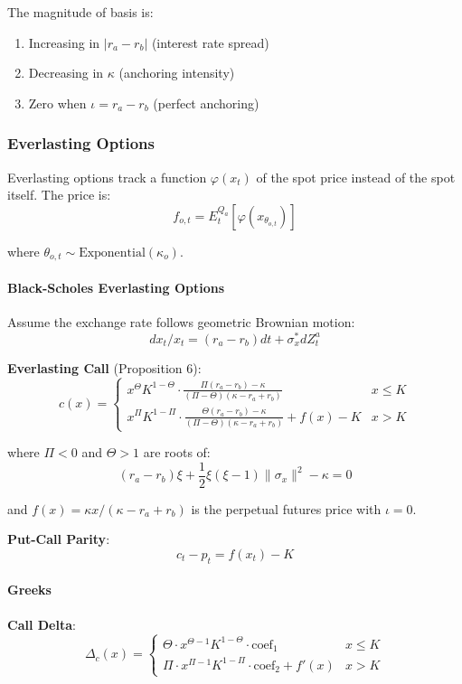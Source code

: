 The magnitude of basis is:
\begin{enumerate}
  \item Increasing in $|r_a - r_b|$ (interest rate spread)
  \item Decreasing in $\kappa$ (anchoring intensity)
  \item Zero when $\iota = r_a - r_b$ (perfect anchoring)
\end{enumerate}

\subsubsection{Everlasting Options}

Everlasting options track a function $\varphi(x_t)$ of the spot price instead of the spot itself. The price is:
\[
f_{o,t} = E^{Q_a}_t\left[\varphi(x_{\theta_{o,t}})\right]
\]

where $\theta_{o,t} \sim \text{Exponential}(\kappa_o)$.

\paragraph{Black-Scholes Everlasting Options}

Assume the exchange rate follows geometric Brownian motion:
\[
dx_t/x_t = (r_a - r_b)dt + \sigma_x^* dZ_t^a
\]

\textbf{Everlasting Call} (Proposition 6):
\[
c(x) = \begin{cases}
x^\Theta K^{1-\Theta} \cdot \frac{\Pi(r_a-r_b)-\kappa}{(\Pi-\Theta)(\kappa-r_a+r_b)} & x \leq K \\[8pt]
x^\Pi K^{1-\Pi} \cdot \frac{\Theta(r_a-r_b)-\kappa}{(\Pi-\Theta)(\kappa-r_a+r_b)} + f(x) - K & x > K
\end{cases}
\]

where $\Pi < 0$ and $\Theta > 1$ are roots of:
\[
(r_a - r_b)\xi + \frac{1}{2}\xi(\xi-1)\|\sigma_x\|^2 - \kappa = 0
\]

and $f(x) = \kappa x / (\kappa - r_a + r_b)$ is the perpetual futures price with $\iota = 0$.

\textbf{Put-Call Parity}:
\[
c_t - p_t = f(x_t) - K
\]

\paragraph{Greeks}

\textbf{Call Delta}:
\[
\Delta_c(x) = \begin{cases}
\Theta \cdot x^{\Theta-1} K^{1-\Theta} \cdot \text{coef}_1 & x \leq K \\
\Pi \cdot x^{\Pi-1} K^{1-\Pi} \cdot \text{coef}_2 + f'(x) & x > K
\end{cases}
\]

